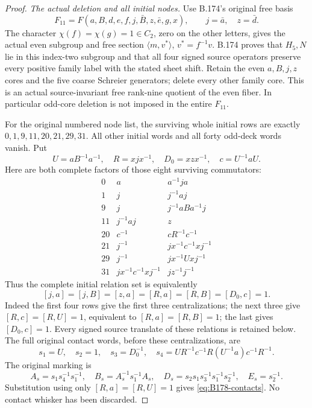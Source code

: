 \begin{proof}
\emph{The actual deletion and all initial nodes.}
Use B.174's original free basis
\[
 F_{11}=F(a,B,d,e,f,j,\bar B,z,\bar e,g,x),
                  \qquad j=\bar a,\quad z=\bar d.
\]
The character \(\chi(f)=\chi(g)=1\in C_2\), zero on the other
letters, gives the actual even subgroup and free section
\(\langle m,v^*\rangle\), \(v^*=f^{-1}v\). B.174 proves that
\(H_5,N\) lie in this index-two subgroup and that all four signed
source operators preserve every positive family label with the stated
sheet shift. Retain the even \(a,B,j,z\) cores and the five coarse
Schreier generators; delete every other family core. This is an actual
source-invariant free rank-nine quotient of the even fiber. In
particular odd-core deletion is not imposed in the entire \(F_{11}\).

For the original numbered node list, the surviving whole initial rows
are exactly \(0,1,9,11,20,21,29,31\). All other initial words and all
forty odd-deck words vanish. Put
\[
 U=aB^{-1}a^{-1},\quad R=xjx^{-1},\quad D_0=xzx^{-1},
                       \quad c=U^{-1}aU.
\]
Here are both complete factors of those eight surviving commutators:
\[
\begin{array}{c|c|c}
 0&a&a^{-1}ja\\
 1&j&j^{-1}aj\\
 9&j&j^{-1}aBa^{-1}j\\
 11&j^{-1}aj&z\\
 20&c^{-1}&cR^{-1}c^{-1}\\
 21&j^{-1}&jx^{-1}c^{-1}xj^{-1}\\
 29&j^{-1}&jx^{-1}Uxj^{-1}\\
 31&jx^{-1}c^{-1}xj^{-1}&jz^{-1}j^{-1}
\end{array}
\]
Thus the complete initial relation set is equivalently
\begin{equation}\label{eq:B178-initial}
 [j,a]=[j,B]=[z,a]=[R,a]=[R,B]=[D_0,c]=1.
\end{equation}
Indeed the first four rows give the first three centralizations;
the next three give \([R,c]=[R,U]=1\), equivalent to
\([R,a]=[R,B]=1\); the last gives \([D_0,c]=1\).
Every signed source translate of these relations is retained below.
The full original contact words, before these centralizations, are
\[
 s_1=U,\quad s_2=1,\quad s_3=D_0^{-1},\quad
 s_4=UR^{-1}c^{-1}R(U^{-1}a)c^{-1}R^{-1}.
\]
The original marking is
\[
 A_s=s_1s_4^{-1}s_1^{-1},\quad
 B_s=A_s^{-1}s_1^{-1}A_s,\quad
 D_s=s_2s_1s_3^{-1}s_1^{-1}s_2^{-1},\quad E_s=s_2^{-1}.
\]
Substitution using only \([R,a]=[R,U]=1\) gives
\eqref{eq:B178-contacts}. No contact whisker has been discarded.


\end{proof}
